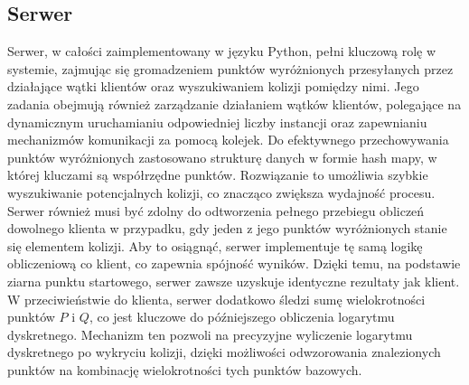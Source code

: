 \subsection{Serwer}
Serwer, w całości zaimplementowany w języku Python, pełni kluczową rolę w systemie,
zajmując się gromadzeniem punktów wyróżnionych przesyłanych przez działające wątki klientów oraz wyszukiwaniem
kolizji pomiędzy nimi. Jego zadania obejmują również zarządzanie działaniem
wątków klientów, polegające na dynamicznym uruchamianiu odpowiedniej liczby instancji
oraz zapewnianiu mechanizmów komunikacji za pomocą kolejek.
Do efektywnego przechowywania punktów wyróżnionych zastosowano strukturę danych w formie
hash mapy, w której kluczami są współrzędne punktów.
Rozwiązanie to umożliwia szybkie wyszukiwanie potencjalnych kolizji,
co znacząco zwiększa wydajność procesu.
Serwer również musi być zdolny do odtworzenia pełnego przebiegu obliczeń dowolnego klienta w przypadku,
gdy jeden z jego punktów wyróżnionych stanie się elementem kolizji.
Aby to osiągnąć, serwer implementuje tę samą logikę obliczeniową co klient,
co zapewnia spójność wyników. Dzięki temu, na podstawie ziarna punktu startowego, serwer zawsze uzyskuje identyczne
rezultaty jak klient.
W przeciwieństwie do klienta,
serwer dodatkowo śledzi sumę wielokrotności punktów $P$ i $Q$,
co jest kluczowe do późniejszego obliczenia logarytmu dyskretnego.
Mechanizm ten pozwoli na precyzyjne wyliczenie logarytmu dyskretnego po wykryciu kolizji, dzięki możliwości
odwzorowania znalezionych punktów na kombinację wielokrotności tych punktów bazowych.

